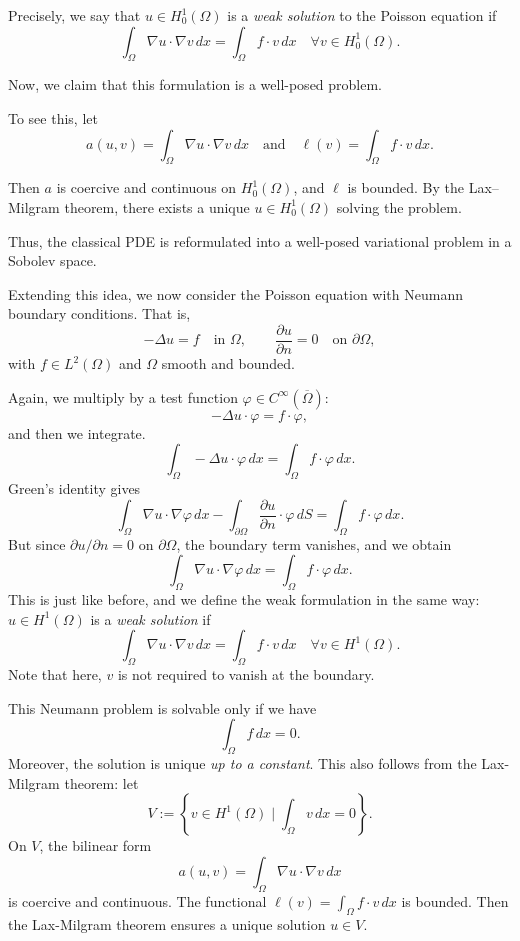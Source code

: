 \documentclass[12pt,letterpaper,reqno]{article}
\theoremstyle{plain}                              %
\theoremstyle{definition}                         %
\theoremstyle{remark}                             %
\numberwithin{equation}{section}
\begin{document}
Precisely, we say that $u \in H_0^1(\Omega)$ is a \textit{weak solution} to the Poisson equation if
\[
\int_\Omega \nabla u \cdot \nabla v \, dx = \int_\Omega f \cdot v \, dx \quad \forall v \in H_0^1(\Omega).
\]

Now, we claim that this formulation is a well-posed problem.

To see this, let \[a(u,v) = \int_\Omega \nabla u \cdot \nabla v \, dx\quad \text{and} \quad \ell(v) = \int_\Omega f \cdot v \, dx.\]

Then $a$ is coercive and continuous on $H_0^1(\Omega)$, and $\ell$ is bounded. By the Lax--Milgram theorem, there exists a unique $u \in H_0^1(\Omega)$ solving the problem.


Thus, the classical PDE is reformulated into a well-posed variational problem in a Sobolev space.

Extending this idea, we now consider the Poisson equation with Neumann boundary conditions.
That is,
\[
- \Delta u = f \quad \text{in } \Omega, \qquad \frac{\partial u}{\partial n} = 0 \quad \text{on } \partial \Omega,
\]
with $f \in L^2(\Omega)$ and $\Omega$ smooth and bounded.

Again, we multiply by a test function $\varphi\in C^{\infty}(\overline{\Omega})$:
\[
-\Delta u \cdot \varphi = f \cdot \varphi,
\]
and then we integrate.
\[
\int_\Omega -\Delta u \cdot \varphi \, dx = \int_\Omega f \cdot \varphi \, dx.
\]
Green's identity gives
\[
\int_\Omega \nabla u \cdot \nabla \varphi \, dx - \int_{\partial \Omega} \frac{\partial u}{\partial n} \cdot \varphi \, dS = \int_\Omega f \cdot \varphi \, dx.
\]
But since $\partial u / \partial n = 0$ on $\partial \Omega$, the boundary term vanishes, and we obtain
\[
\int_\Omega \nabla u \cdot \nabla \varphi \, dx = \int_\Omega f \cdot \varphi \, dx.
\]
This is just like before, and we define the weak formulation in the same way: $u \in H^1(\Omega)$ is a \textit{weak solution} if
\[
\int_\Omega \nabla u \cdot \nabla v \, dx = \int_\Omega f \cdot v \, dx \quad \forall v \in H^1(\Omega).
\]
Note that here, $v$ is not required to vanish at the boundary.


This Neumann problem is solvable only if we have
\[
\int_\Omega f \, dx = 0.
\]
Moreover, the solution is unique \textit{up to a constant}.
This also follows from the Lax-Milgram theorem: let
\[
V := \left\{ v \in H^1(\Omega) \mid \int_\Omega v \, dx = 0 \right\}.
\]
On $V$, the bilinear form
\[
a(u,v) = \int_\Omega \nabla u \cdot \nabla v \, dx
\]
is coercive and continuous. The functional $\ell(v) = \int_\Omega f \cdot v \, dx$ is bounded. Then the Lax-Milgram theorem ensures a unique solution $u \in V$.
\end{document}
